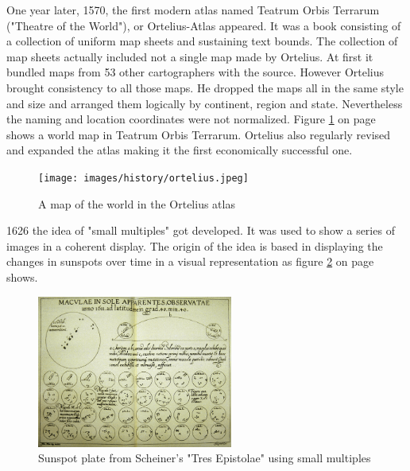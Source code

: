 One year later, 1570, the first modern atlas named Teatrum Orbis Terrarum ("Theatre of the World"), or Ortelius-Atlas appeared. It was a book consisting of a collection of uniform map sheets and sustaining text bounds. The collection of map sheets actually included not a single map made by Ortelius. At first it bundled maps from 53 other cartographers with the source. However Ortelius brought consistency to all those maps. He dropped the maps all in the same style and size and arranged them logically by continent, region and state. Nevertheless the naming and location coordinates were not normalized. Figure \ref{fig:ortelius} on page \pageref{fig:ortelius} shows a world map in Teatrum Orbis Terrarum. Ortelius also regularly revised and expanded the atlas making it the first economically successful one.

\begin{figure}[!htb]
\centering
\texttt{[image: images/history/ortelius.jpeg]}
\caption[
    A map of the world in the Ortelius atlas, Urldate: 07.2016 \newline
\small\texttt{\url{https://upload.wikimedia.org/wikipedia/commons/6/6f/OrteliusWorldMap.jpeg}}
]{A map of the world in the Ortelius atlas}
\label{fig:ortelius}
\end{figure}

1626 the idea of "small multiples" got developed. It was used to show a series of images in a coherent display. The origin of the idea is based in displaying the changes in sunspots over time in a visual representation as figure \ref{fig:small-multiples} on page \pageref{fig:small-multiples} shows.

\begin{figure}[!htb]
\centering
\includegraphics[height=5cm,keepaspectratio]{images/history/small-multiples.png}
\caption[
    Sunspot plate from Scheiner's "Tres Epistolae" using small multiples, Urldate: 07.2016 \newline
\small\texttt{\url{http://cnx.rice.edu/content/m11970/latest/tres_epistolae.gif}}
]{Sunspot plate from Scheiner's "Tres Epistolae" using small multiples}
\label{fig:small-multiples}
\end{figure}

